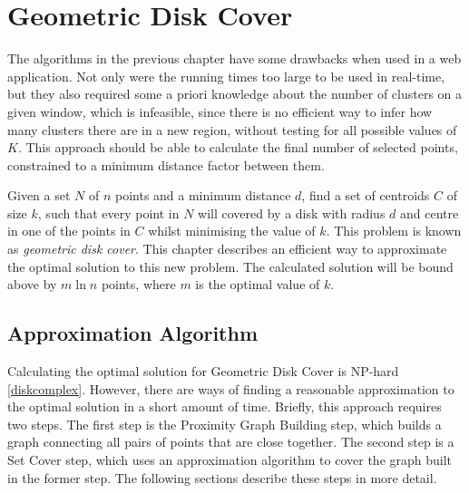 \chapter{Geometric Disk Cover}
\label{chap:approx}

The algorithms in the previous chapter have some drawbacks when used in a web application. Not only were the running times too large to be used in real-time, but they also required some a priori knowledge about the number of clusters on a given window, which is infeasible, since there is no efficient way to infer how many clusters there are in a new region, without testing for all possible values of $K$. This approach should be able to calculate the final number of selected points, constrained to a minimum distance factor between them.

Given a set $N$ of $n$ points and a minimum distance $d$, find a set of centroids $C$ of size $k$, such that every point in $N$ will covered by a disk with radius $d$ and centre in one of the points in $C$ whilst minimising the value of $k$. This problem is known as \emph{geometric disk cover}\cite{geodisk}. This chapter describes an efficient way to approximate the optimal solution to this new problem. The calculated solution will be bound above by $m \ln {n}$ points, where $m$ is the optimal value of $k$.

\section{Approximation Algorithm}
Calculating the optimal solution for Geometric Disk Cover is {NP-hard} \ref{diskcomplex}. However, there are ways of finding a reasonable approximation to the optimal solution in a short amount of time. Briefly, this approach requires two steps. The first step is the Proximity Graph Building step, which builds a graph connecting all pairs of points that are close together. The second step is a Set Cover step, which uses an approximation algorithm to cover the graph built in the former step. The following sections describe these steps in more detail.

